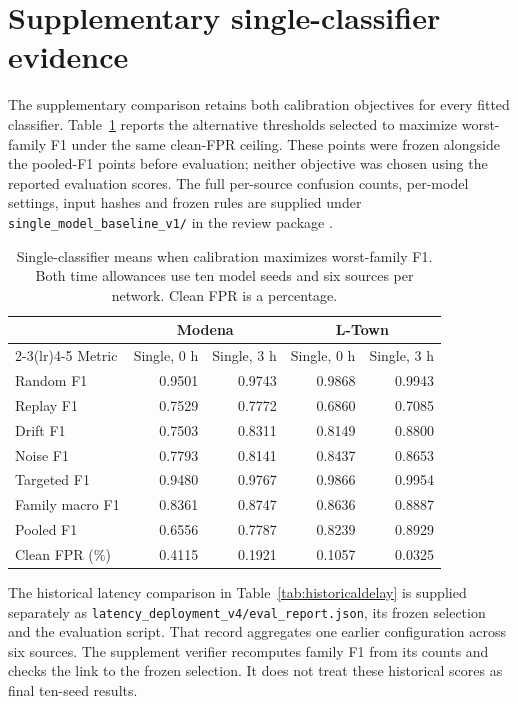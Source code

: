 \section{Supplementary single-classifier evidence}
\label{sec:baselineappendix}
The supplementary comparison retains both calibration objectives for every fitted classifier. Table~\ref{tab:balancedbaseline} reports the alternative thresholds selected to maximize worst-family F1 under the same clean-FPR ceiling. These points were frozen alongside the pooled-F1 points before evaluation; neither objective was chosen using the reported evaluation scores. The full per-source confusion counts, per-model settings, input hashes and frozen rules are supplied under \texttt{single\_model\_baseline\_v1/} in the review package \cite{projectbaseline}.
\begin{table}[!htbp]
\centering\small
\caption[Single-classifier results with family-balanced calibration]{Single-classifier means when calibration maximizes worst-family F1. Both time allowances use ten model seeds and six sources per network. Clean FPR is a percentage.}
\label{tab:balancedbaseline}
\begin{tabular}{@{}lrrrr@{}}
\toprule
& \multicolumn{2}{c}{Modena} & \multicolumn{2}{c}{L-Town}\\
\cmidrule(lr){2-3}\cmidrule(lr){4-5}
Metric & Single, 0 h & Single, 3 h & Single, 0 h & Single, 3 h\\
\midrule
Random F1 & 0.9501 & 0.9743 & 0.9868 & 0.9943\\
Replay F1 & 0.7529 & 0.7772 & 0.6860 & 0.7085\\
Drift F1 & 0.7503 & 0.8311 & 0.8149 & 0.8800\\
Noise F1 & 0.7793 & 0.8141 & 0.8437 & 0.8653\\
Targeted F1 & 0.9480 & 0.9767 & 0.9866 & 0.9954\\
Family macro F1 & 0.8361 & 0.8747 & 0.8636 & 0.8887\\
Pooled F1 & 0.6556 & 0.7787 & 0.8239 & 0.8929\\
Clean FPR (\%) & 0.4115 & 0.1921 & 0.1057 & 0.0325\\
\bottomrule
\end{tabular}
\end{table}
\FloatBarrier
The historical latency comparison in Table~\ref{tab:historicaldelay} is supplied separately as \texttt{latency\_deployment\_v4/eval\_report.json}, its frozen selection and the evaluation script. That record aggregates one earlier configuration across six sources. The supplement verifier recomputes family F1 from its counts and checks the link to the frozen selection. It does not treat these historical scores as final ten-seed results.
